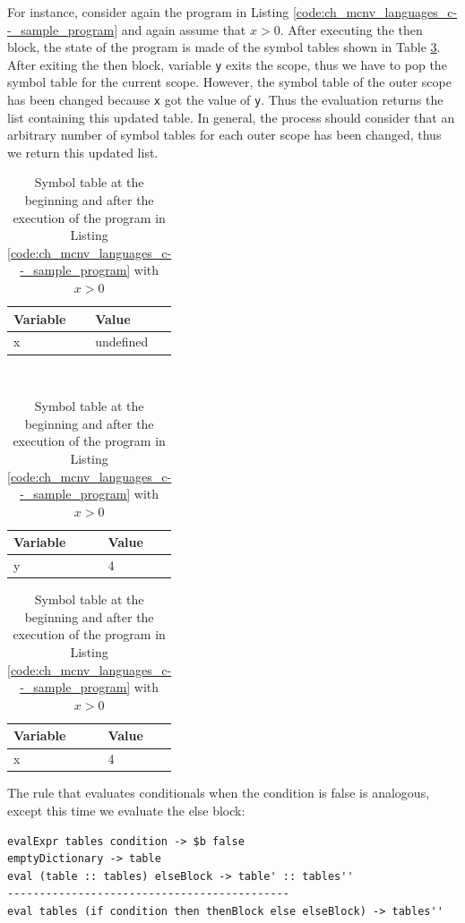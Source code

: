 For instance, consider again the program in Listing \ref{code:ch_mcnv_languages_c--_sample_program} and again assume that $x > 0$. After executing the then block, the state of the program is made of the symbol tables shown in Table \ref{tab:ch_mcnv_languages_tables_ifthenelse}. After exiting the then block, variable \texttt{y} exits the scope, thus we have to pop the symbol table for the current scope. However, the symbol table of the outer scope has been changed because \texttt{x} got the value of \texttt{y}. Thus the evaluation returns the list containing this updated table. In general, the process should consider that an arbitrary number of symbol tables for each outer scope has been changed, thus we return this updated list.

\begin{table}
	\centering
	\begin{tabular}{|l|l|}
		\hline
		\textbf{Variable} & \textbf{Value} \\
		\hline
		x & undefined\\
		\hline
	\end{tabular}\\
	\vspace{0.2cm}
	\begin{tabular}{|l|l|}
		\hline
		\textbf{Variable} & \textbf{Value} \\
		\hline
		y & 4\\
		\hline
	\end{tabular}
	\begin{tabular}{|l|l|}
		\hline
		\textbf{Variable} & \textbf{Value} \\
		\hline
		x & 4\\
		\hline
	\end{tabular}
	\caption{Symbol table at the beginning and after the execution of the program in Listing \ref{code:ch_mcnv_languages_c--_sample_program} with $x > 0$}
	\label{tab:ch_mcnv_languages_tables_ifthenelse}
\end{table}

The rule that evaluates conditionals when the condition is false is analogous, except this time we evaluate the else block:

\begin{lstlisting}
evalExpr tables condition -> $b false
emptyDictionary -> table
eval (table :: tables) elseBlock -> table' :: tables''
--------------------------------------------
eval tables (if condition then thenBlock else elseBlock) -> tables''
\end{lstlisting}

